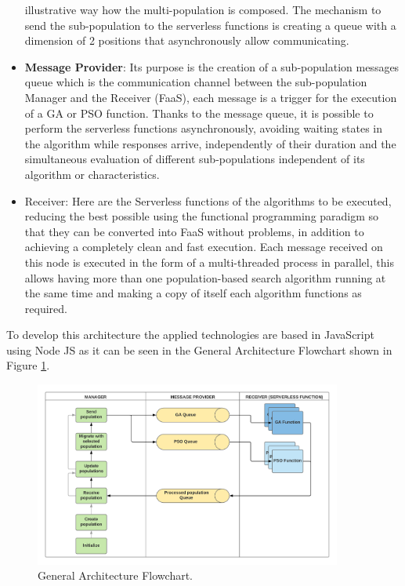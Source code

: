 \documentclass[runningheads]{llncs}
\begin{document}
\begin{itemize}
  illustrative way how the multi-population is composed.
  The mechanism to send the sub-population to the serverless functions is
 creating a queue with a dimension of 2 positions that asynchronously allow
 communicating.
\item {\bf Message Provider}: Its purpose is the creation of a sub-population messages
  queue which is the communication channel %
  between the sub-population Manager and
the Receiver (FaaS), each message is a trigger for the execution of a GA or PSO
function. Thanks to the message queue, it is possible to perform the serverless
functions asynchronously, avoiding waiting states in the algorithm
while responses arrive, 
independently of their duration and the simultaneous evaluation of different
sub-populations independent of its algorithm or characteristics.
\item Receiver: Here are the Serverless
  functions of the %
algorithms to be executed, reducing the best possible using the functional
programming paradigm so that they can be converted into FaaS without problems,
in addition to achieving a completely clean and fast
execution\cite{Roberts2016}. Each message received on this node is executed in
the form of a multi-threaded process in parallel, this allows having more than
one population-based search algorithm running at the same time and making a copy
of itself each algorithm functions as required.
\end{itemize}

To develop this architecture the applied technologies are based in JavaScript
using Node JS as it can be seen in the General Architecture Flowchart
shown in Figure \ref{fig2}.

\begin{figure}[htp]
  \centering
  \includegraphics[width=0.9\textwidth]{img/Architecture diagram.png}
  \caption{General Architecture Flowchart.} \label{fig2}
  \end{figure}
  
\end{document}
